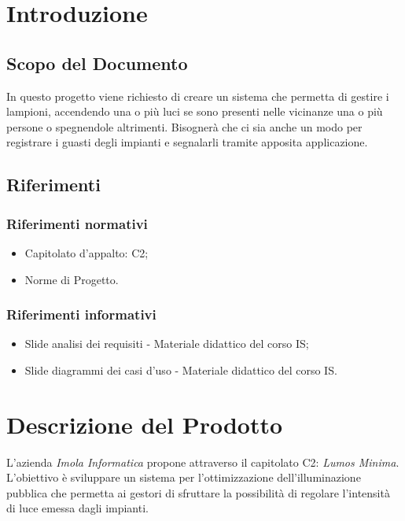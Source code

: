 \documentclass[a4paper, 12pt]{article}
\begin{document}
\makeindexdetails
\makefrontpage \makeversioni
\tableofcontents
\newpage
\clearpage
{} 

\section{Introduzione}
\subsection{Scopo del Documento}
In questo progetto viene richiesto di creare un sistema che permetta di gestire i lampioni, accendendo una o più luci se sono presenti nelle vicinanze una o più persone o spegnendole altrimenti.\newline
Bisognerà che ci sia anche un modo per registrare i guasti degli impianti e segnalarli tramite apposita applicazione.

\subsection{Riferimenti}
\subsubsection*{Riferimenti normativi}
\begin{itemize}
    \item Capitolato d'appalto: C2;
    \item Norme di Progetto.
\end{itemize}

\subsubsection*{Riferimenti informativi}
\begin{itemize}
    \item Slide analisi dei requisiti - Materiale didattico del corso IS;
    \item Slide diagrammi dei casi d'uso - Materiale didattico del corso IS.
\end{itemize}

\section{Descrizione del Prodotto}
L'azienda \textit{Imola Informatica} propone attraverso il capitolato C2: \textit{Lumos Minima}. L'obiettivo è sviluppare un sistema per l'ottimizzazione dell'illuminazione pubblica che permetta ai gestori di sfruttare la possibilità di regolare l'intensità di luce emessa dagli impianti.
\end{document}
